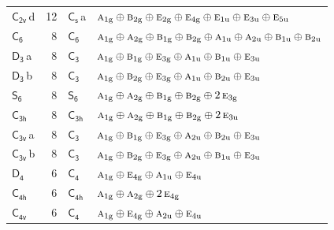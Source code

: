 \documentclass[10pt,a4paper]{article}
\numberwithin{equation}{section}
\newcommand{\grp}[1]{\mathsf{#1}}
\newcommand{\irr}[1]{\text{\normalfont\scshape #1}}
\newcommand{\ptag}[1]{\mathrm{#1}}
\newcommand{\clsletter}[1]{\,{\scriptsize\color{black!55}#1}}
\newlength{\fillwidth}\newlength{\cellwidth}\newlength{\colwidth}
\begin{document}
{\begin{longtable}{@{}lrl>{\RaggedRight\arraybackslash}p{\fillwidth}@{}}
\href{C2v.pdf}{$\grp{C_{2v}}$}\clsletter{d} & 12 & \href{C1v.pdf}{$\grp{C_{s}}$}\clsletter{a} & $\irr{a}_{1\ptag{g}}\oplus \irr{b}_{2\ptag{g}}\oplus \irr{e}_{2\ptag{g}}\oplus \irr{e}_{4\ptag{g}}\oplus \irr{e}_{1\ptag{u}}\oplus \irr{e}_{3\ptag{u}}\oplus \irr{e}_{5\ptag{u}}$\\
\href{C6.pdf}{$\grp{C_{6}}$} & 8 & \href{C6.pdf}{$\grp{C_{6}}$} & $\irr{a}_{1\ptag{g}}\oplus \irr{a}_{2\ptag{g}}\oplus \irr{b}_{1\ptag{g}}\oplus \irr{b}_{2\ptag{g}}\oplus \irr{a}_{1\ptag{u}}\oplus \irr{a}_{2\ptag{u}}\oplus \irr{b}_{1\ptag{u}}\oplus \irr{b}_{2\ptag{u}}$\\
\href{D3.pdf}{$\grp{D_{3}}$}\clsletter{a} & 8 & \href{C3.pdf}{$\grp{C_{3}}$} & $\irr{a}_{1\ptag{g}}\oplus \irr{b}_{1\ptag{g}}\oplus \irr{e}_{3\ptag{g}}\oplus \irr{a}_{1\ptag{u}}\oplus \irr{b}_{1\ptag{u}}\oplus \irr{e}_{3\ptag{u}}$\\
\href{D3.pdf}{$\grp{D_{3}}$}\clsletter{b} & 8 & \href{C3.pdf}{$\grp{C_{3}}$} & $\irr{a}_{1\ptag{g}}\oplus \irr{b}_{2\ptag{g}}\oplus \irr{e}_{3\ptag{g}}\oplus \irr{a}_{1\ptag{u}}\oplus \irr{b}_{2\ptag{u}}\oplus \irr{e}_{3\ptag{u}}$\\
\href{S6.pdf}{$\grp{S_{6}}$} & 8 & \href{S6.pdf}{$\grp{S_{6}}$} & $\irr{a}_{1\ptag{g}}\oplus \irr{a}_{2\ptag{g}}\oplus \irr{b}_{1\ptag{g}}\oplus \irr{b}_{2\ptag{g}}\oplus 2\,\irr{e}_{3\ptag{g}}$\\
\href{C3h.pdf}{$\grp{C_{3h}}$} & 8 & \href{C3h.pdf}{$\grp{C_{3h}}$} & $\irr{a}_{1\ptag{g}}\oplus \irr{a}_{2\ptag{g}}\oplus \irr{b}_{1\ptag{g}}\oplus \irr{b}_{2\ptag{g}}\oplus 2\,\irr{e}_{3\ptag{u}}$\\
\href{C3v.pdf}{$\grp{C_{3v}}$}\clsletter{a} & 8 & \href{C3.pdf}{$\grp{C_{3}}$} & $\irr{a}_{1\ptag{g}}\oplus \irr{b}_{1\ptag{g}}\oplus \irr{e}_{3\ptag{g}}\oplus \irr{a}_{2\ptag{u}}\oplus \irr{b}_{2\ptag{u}}\oplus \irr{e}_{3\ptag{u}}$\\
\href{C3v.pdf}{$\grp{C_{3v}}$}\clsletter{b} & 8 & \href{C3.pdf}{$\grp{C_{3}}$} & $\irr{a}_{1\ptag{g}}\oplus \irr{b}_{2\ptag{g}}\oplus \irr{e}_{3\ptag{g}}\oplus \irr{a}_{2\ptag{u}}\oplus \irr{b}_{1\ptag{u}}\oplus \irr{e}_{3\ptag{u}}$\\
\href{D4.pdf}{$\grp{D_{4}}$} & 6 & \href{C4.pdf}{$\grp{C_{4}}$} & $\irr{a}_{1\ptag{g}}\oplus \irr{e}_{4\ptag{g}}\oplus \irr{a}_{1\ptag{u}}\oplus \irr{e}_{4\ptag{u}}$\\
\href{C4h.pdf}{$\grp{C_{4h}}$} & 6 & \href{C4h.pdf}{$\grp{C_{4h}}$} & $\irr{a}_{1\ptag{g}}\oplus \irr{a}_{2\ptag{g}}\oplus 2\,\irr{e}_{4\ptag{g}}$\\
\href{C4v.pdf}{$\grp{C_{4v}}$} & 6 & \href{C4.pdf}{$\grp{C_{4}}$} & $\irr{a}_{1\ptag{g}}\oplus \irr{e}_{4\ptag{g}}\oplus \irr{a}_{2\ptag{u}}\oplus \irr{e}_{4\ptag{u}}$\\

\end{longtable}}
\end{document}
